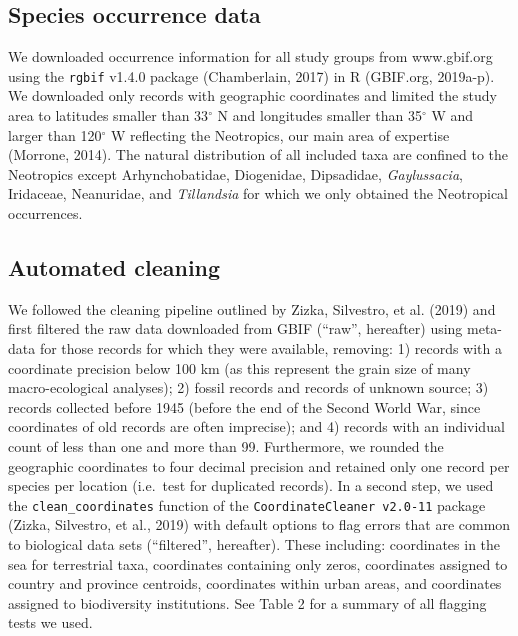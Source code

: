 \documentclass[
  12pt,
]{article}
\begin{document}
\hypertarget{species-occurrence-data}{%
\subsection{Species occurrence data}\label{species-occurrence-data}}

We downloaded occurrence information for all study groups from www.gbif.org using the \texttt{rgbif} v1.4.0 package (Chamberlain, 2017) in R (GBIF.org, 2019a-p). We downloaded only records with geographic coordinates and limited the study area to latitudes smaller than 33\(^\circ\) N and longitudes smaller than 35\(^\circ\) W and larger than 120\(^\circ\) W reflecting the Neotropics, our main area of expertise (Morrone, 2014). The natural distribution of all included taxa are confined to the Neotropics except Arhynchobatidae, Diogenidae, Dipsadidae, \emph{Gaylussacia}, Iridaceae, Neanuridae, and \emph{Tillandsia} for which we only obtained the Neotropical occurrences.

\hypertarget{automated-cleaning}{%
\subsection{Automated cleaning}\label{automated-cleaning}}

We followed the cleaning pipeline outlined by Zizka, Silvestro, et al. (2019) and first filtered the raw data downloaded from GBIF (``raw'', hereafter) using meta-data for those records for which they were available, removing: 1) records with a coordinate precision below 100 km (as this represent the grain size of many macro-ecological analyses); 2) fossil records and records of unknown source; 3) records collected before 1945 (before the end of the Second World War, since coordinates of old records are often imprecise); and 4) records with an individual count of less than one and more than 99. Furthermore, we rounded the geographic coordinates to four decimal precision and retained only one record per species per location (i.e.~test for duplicated records). In a second step, we used the \texttt{clean\_coordinates} function of the \texttt{CoordinateCleaner\ v2.0-11} package (Zizka, Silvestro, et al., 2019) with default options to flag errors that are common to biological data sets (``filtered'', hereafter). These including: coordinates in the sea for terrestrial taxa, coordinates containing only zeros, coordinates assigned to country and province centroids, coordinates within urban areas, and coordinates assigned to biodiversity institutions. See Table 2 for a summary of all flagging tests we used.
\end{document}
